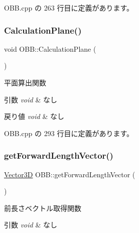  O\+B\+B.\+cpp の 263 行目に定義があります。

\mbox{\label{class_o_b_b_ac3f9bb13d4d941435bf53b3e2b070431}} 
\subsubsection{\texorpdfstring{Calculation\+Plane()}{CalculationPlane()}}
{\footnotesize\ttfamily void O\+B\+B\+::\+Calculation\+Plane (\begin{DoxyParamCaption}{ }\end{DoxyParamCaption})\hspace{0.3cm}{\ttfamily [private]}}



平面算出関数 


\begin{DoxyParams}{引数}
{\em void} & なし \\
\hline
\end{DoxyParams}

\begin{DoxyRetVals}{戻り値}
{\em void} & なし \\
\hline
\end{DoxyRetVals}


 O\+B\+B.\+cpp の 293 行目に定義があります。

\mbox{\label{class_o_b_b_a94b2f93f025e4684c414c7fa1d0447ee}} 
\subsubsection{\texorpdfstring{get\+Forward\+Length\+Vector()}{getForwardLengthVector()}}
{\footnotesize\ttfamily \mbox{\hyperlink{class_vector3_d}{Vector3D}} O\+B\+B\+::get\+Forward\+Length\+Vector (\begin{DoxyParamCaption}{ }\end{DoxyParamCaption})}



前長さベクトル取得関数 


\begin{DoxyParams}{引数}
{\em void} & なし \\
\hline
\end{DoxyParams}

